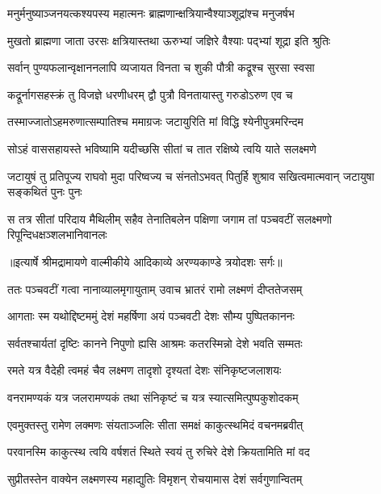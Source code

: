 \twolineshloka
{मनुर्मनुष्याञ्जनयत्कश्यपस्य महात्मनः}
{ब्राह्मणान्क्षत्रियान्वैश्याञ्शूद्रांश्च मनुजर्षभ} %

\twolineshloka
{मुखतो ब्राह्मणा जाता उरसः क्षत्रियास्तथा}
{ऊरुभ्यां जज्ञिरे वैश्याः पद्भ्यां शूद्रा इति श्रुतिः} %

\twolineshloka
{सर्वान् पुण्यफलान्वृक्षाननलापि व्यजायत}
{विनता च शुकी पौत्री कद्रूश्च सुरसा स्वसा} %

\twolineshloka
{कद्रूर्नागसहस्क्रं तु विजज्ञे धरणीधरम्}
{द्वौ पुत्रौ विनतायास्तु गरुडोऽरुण एव च} %

\twolineshloka
{तस्माज्जातोऽहमरुणात्सम्पातिश्च ममाग्रजः}
{जटायुरिति मां विद्धि श्येनीपुत्रमरिन्दम} %

\twolineshloka
{सोऽहं वाससहायस्ते भविष्यामि यदीच्छसि}
{सीतां च तात रक्षिष्ये त्वयि याते सलक्ष्मणे} %

\fourlineindentedshloka
{जटायुषं तु प्रतिपूज्य राघवो}
{मुदा परिष्वज्य च संनतोऽभवत्}
{पितुर्हि शुश्राव सखित्वमात्मवान्}
{जटायुषा सङ्कथितं पुनः पुनः} %

\fourlineindentedshloka
{स तत्र सीतां परिदाय मैथिलीम्}
{सहैव तेनातिबलेन पक्षिणा}
{जगाम तां पञ्चवटीं सलक्ष्मणो}
{रिपून्दिधक्षञ्शलभानिवानलः} %


{॥इत्यार्षे श्रीमद्रामायणे वाल्मीकीये आदिकाव्ये अरण्यकाण्डे त्रयोदशः सर्गः॥}


\twolineshloka
{ततः पञ्चवटीं गत्वा नानाव्यालमृगायुताम्}
{उवाच भ्रातरं रामो लक्ष्मणं दीप्ततेजसम्} %

\twolineshloka
{आगताः स्म यथोद्दिष्टममुं देशं महर्षिणा}
{अयं पञ्चवटी देशः सौम्य पुष्पितकाननः} %

\twolineshloka
{सर्वतश्चार्यतां दृष्टिः कानने निपुणो ह्यसि}
{आश्रमः कतरस्मिन्नो देशे भवति सम्मतः} %

\twolineshloka
{रमते यत्र वैदेही त्वमहं चैव लक्ष्मण}
{तादृशो दृश्यतां देशः संनिकृष्टजलाशयः} %

\twolineshloka
{वनरामण्यकं यत्र जलरामण्यकं तथा}
{संनिकृष्टं च यत्र स्यात्समित्पुष्पकुशोदकम्} %

\twolineshloka
{एवमुक्तस्तु रामेण लक्मणः संयताञ्जलिः}
{सीता समक्षं काकुत्स्थमिदं वचनमब्रवीत्} %

\twolineshloka
{परवानस्मि काकुत्स्थ त्वयि वर्षशतं स्थिते}
{स्वयं तु रुचिरे देशे क्रियतामिति मां वद} %

\twolineshloka
{सुप्रीतस्तेन वाक्येन लक्ष्मणस्य महाद्युतिः}
{विमृशन् रोचयामास देशं सर्वगुणान्वितम्} %

